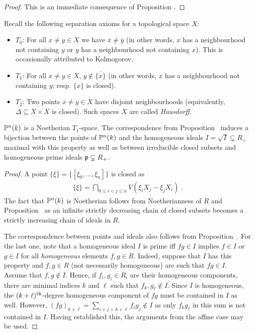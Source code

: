 \documentclass[a4paper,parskip=half,numbers=enddot, DIV=12]{scrreprt}
\begin{document}
\begin{proof}
	This is an immediate consequence of Proposition .
\end{proof}
\begin{rem*}Recall the following separation axioms for a topological space $X$:
\begin{itemize}
\item $T_0$:
For all $x\neq y\in X$ we have $\overline x\neq\overline y$ (in other words, $x$ has a neighbourhood
not containing $y$ or $y$ has a neighbourhood not containing $x$). This is occasionally attributed to Kolmogorov.
\item $T_1$: For all $x\neq y\in X$, $y\notin\overline{\{ x\}}$ (in other words, $x$ has a neighbourhood not containing $y$;
resp. $\{x\}$ is closed).
\item $T_2$: Two points $x\neq y\in X$ have disjoint neighbourhoods (equivalently, $\Delta\subseteq X\times X$ is closed). Such spaces $X$ are called \emph{Hausdorff}.
\end{itemize}
\end{rem*}
\begin{prop}
$\mathbb{P}^n(k)$ is a Noetherian $T_1$-space. The correspondence from  Proposition~ induces a bijection between the points of $\mathbb{P}^n(k)$ and the homogeneous
ideals $I=\sqrt I\subsetneq R_+$ maximal with this property as well as between irreducible closed subsets and homogeneous prime ideals $\mathfrak{p}\subsetneq R_+$.
\end{prop}
\begin{proof}
A point $\{\xi\} = \{[\xi_0,\ldots,\xi_n]\}$ is closed as 
\begin{align*}
	\{\xi\}=\bigcap_{0\leq i<j\leq n} V( \xi_i X_j - \xi_j X_i)\;.
\end{align*}
The fact that $\mathbb{P}^n(k)$ is Noetherian follows from Noetherianness of $R$ and Proposition~
as an infinite strictly decreasing chain of closed subsets becomes a strictly increasing chain of ideals in $R$.

The correspondence between points and ideals also follows from Proposition~. For the last one, note that a homogeneous ideal $I$ is prime iff $fg\in I$ implies $f\in I$ or $g\in I$ for all \emph{homogeneous} elements $f,g\in R$. Indeed, suppose that $I$ has this property and $f,g\in R$ (not necessarily homogeneous) are such that $fg\in I$. Assume that $f,g\notin I$. Hence, if $f_i,g_i\in R_i$ are their homogeneous components, there are minimal indices $k$ and $\ell$ such that $f_k,g_\ell\notin I$. Since $I$ is homogeneous, the $(k+\ell)^{\text{th}}$-degree homogeneous component of $fg$ must be contained in $I$ as well. However, $(fg)_{k+\ell}=\sum_{i+j=k+\ell}f_ig_j\notin I$ as only $f_kg_\ell$ in this sum is not contained in $I$. Having established this, the arguments from the affine case may be used.
\end{proof}
\end{document}
